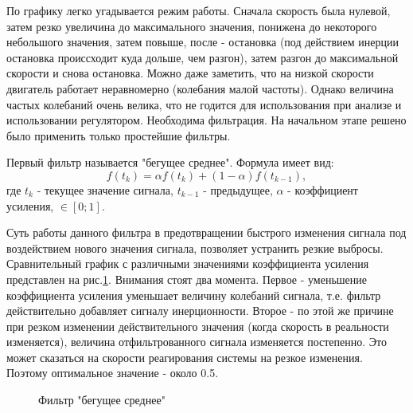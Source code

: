 \documentclass[14pt,a4paper,russian]{scrartcl}
\begin{document}
По графику легко угадывается режим работы. Сначала скорость была нулевой, затем
резко увеличина до максимального значения, понижена до некоторого небольшого значения,
затем повыше, после - остановка (под действием инерции остановка происсходит куда дольше,
чем разгон), затем разгон до максимальной скорости и снова остановка. Можно
даже заметить, что на низкой скорости двигатель работает неравномерно (колебания
малой частоты). Однако величина частых колебаний очень велика, что не годится
для использования при анализе и использовании регулятором. Необходима фильтрация. 
На начальном этапе решено было применить только простейшие фильтры.

Первый фильтр называется "бегущее среднее". Формула имеет вид:
\[ f(t_k) = \alpha f(t_k) + (1-\alpha)f(t_{k-1}), \]
где \(t_k\) - текущее значение сигнала, \(t_{k-1}\) - предыдущее,
\(\alpha\) - коэффициент усиления, \(\in [0; 1]\).\par
Суть работы данного фильтра в предотвращении быстрого изменения сигнала
под воздействием нового значения сигнала, позволяет устранить резкие выбросы. 
Сравнительный график с различными значениями коэффициента усиления
представлен на рис.\ref{fig:running_average}. Внимания стоят два момента. Первое - 
уменьшение коэффициента усиления уменьшает величину колебаний сигнала, т.е.
фильтр действительно добавляет сигналу инерционности. Второе - по этой же причине
при резком изменении действительного значения (когда скорость в реальности изменяется),
величина отфильтрованного сигнала изменяется постепенно. Это может сказаться на скорости
реагирования системы на резкое изменения. Поэтому оптимальное значение - около 0.5.

\begin{figure}[h]
    \caption{Фильтр "бегущее среднее"}
    \label{fig:running_average}
\end{figure}
\end{document}

